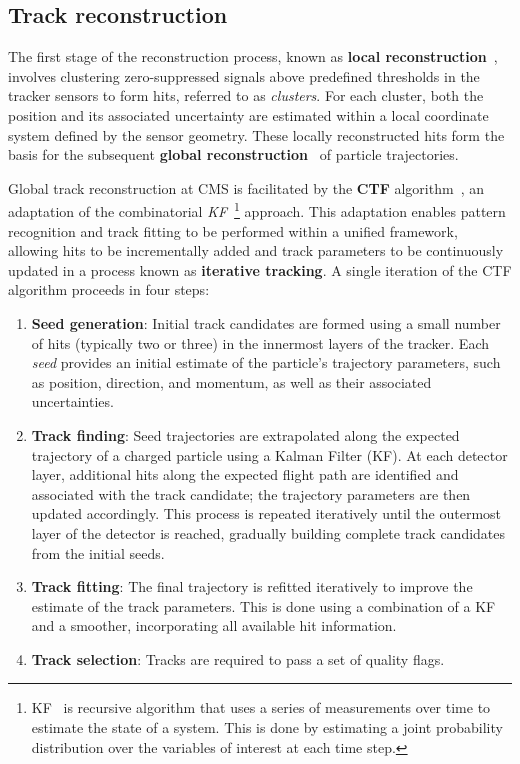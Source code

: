 \subsection{Track reconstruction}

The first stage of the reconstruction process, known as \textbf{local reconstruction}~\cite{CMS_TrackerPerformance_2014,CMS_Track_Reconstruction_Run2_3}, involves clustering zero-suppressed signals above predefined thresholds in the tracker sensors to form hits, referred to as \textit{clusters}. For each cluster, both the position and its associated uncertainty are estimated within a local coordinate system defined by the sensor geometry. These locally reconstructed hits form the basis for the subsequent \textbf{global reconstruction}~\cite{CMS_TrackerPerformance_2014,CMS_Track_Reconstruction_Run2_3} of particle trajectories.

Global track reconstruction at CMS is facilitated by the \textbf{\ac{CTF}} algorithm~\cite{CMS_TrackerPerformance_2014,CMS_Track_Reconstruction_Run2_3}, an adaptation of the combinatorial \textit{\ac{KF}}~\cite{KF_1,KF_2,KF_3}\footnote{KF~\cite{KF_4} is recursive algorithm that uses a series of measurements over time to estimate the state of a system. This is done by estimating a joint probability distribution over the variables of interest at each time step.} approach. This adaptation enables pattern recognition and track fitting to be performed within a unified framework, allowing hits to be incrementally added and track parameters to be continuously updated in a process known as \textbf{iterative tracking}. A single iteration of the CTF algorithm proceeds in four steps:

\begin{enumerate}
    \item \textbf{Seed generation}: Initial track candidates are formed using a small number of hits (typically two or three) in the innermost layers of the tracker. Each \textit{seed} provides an initial estimate of the particle's trajectory parameters, such as position, direction, and momentum, as well as their associated uncertainties. 
    \item \textbf{Track finding}: Seed trajectories are extrapolated along the expected trajectory of a charged particle using a Kalman Filter (KF). At each detector layer, additional hits along the expected flight path are identified and associated with the track candidate; the trajectory parameters are then updated accordingly. This process is repeated iteratively until the outermost layer of the detector is reached, gradually building complete track candidates from the initial seeds.
    \item \textbf{Track fitting}: The final trajectory is refitted iteratively to improve the estimate of the track parameters. This is done using a combination of a KF and a smoother, incorporating all available hit information.
    \item \textbf{Track selection}: Tracks are required to pass a set of quality flags.
\end{enumerate}

